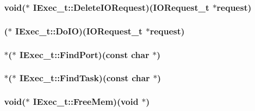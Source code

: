 \hypertarget{structIExec__t_a694b5568caaca24b387d990d1e9bddb5}{
\subsubsection[{Delete\+I\+O\+Request}]{\setlength{\rightskip}{0pt plus 5cm}void($\ast$ I\+Exec\+\_\+t\+::\+Delete\+I\+O\+Request)({\bf I\+O\+Request\+\_\+t} $\ast$request)}}\label{structIExec__t_a694b5568caaca24b387d990d1e9bddb5}
\hypertarget{structIExec__t_adfd1dc0bd8f0bd8d419573e6c6ad4907}{
\subsubsection[{Do\+I\+O}]{($\ast$ I\+Exec\+\_\+t\+::\+Do\+I\+O)({\bf I\+O\+Request\+\_\+t} $\ast$request)}}\label{structIExec__t_adfd1dc0bd8f0bd8d419573e6c6ad4907}
\hypertarget{structIExec__t_a9d511dd8847f1ceec03dc1f0cb6c4b71}{
\subsubsection[{Find\+Port}]{$\ast$($\ast$ I\+Exec\+\_\+t\+::\+Find\+Port)(const char $\ast$)}}\label{structIExec__t_a9d511dd8847f1ceec03dc1f0cb6c4b71}
\hypertarget{structIExec__t_a6003849f8348bceaed6435d63ac4f47f}{
\subsubsection[{Find\+Task}]{$\ast$($\ast$ I\+Exec\+\_\+t\+::\+Find\+Task)(const char $\ast$)}}\label{structIExec__t_a6003849f8348bceaed6435d63ac4f47f}
\hypertarget{structIExec__t_aeb4211f91bb1ca9cadde95d97b6b9da9}{
\subsubsection[{Free\+Mem}]{\setlength{\rightskip}{0pt plus 5cm}void($\ast$ I\+Exec\+\_\+t\+::\+Free\+Mem)(void $\ast$)}}\label{structIExec__t_aeb4211f91bb1ca9cadde95d97b6b9da9}
